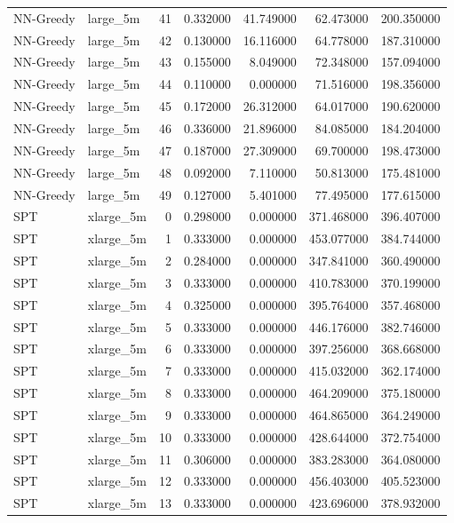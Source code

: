 \begin{tabular}{llrrrrr}
NN-Greedy & large_5m & 41 & 0.332000 & 41.749000 & 62.473000 & 200.350000 \\
NN-Greedy & large_5m & 42 & 0.130000 & 16.116000 & 64.778000 & 187.310000 \\
NN-Greedy & large_5m & 43 & 0.155000 & 8.049000 & 72.348000 & 157.094000 \\
NN-Greedy & large_5m & 44 & 0.110000 & 0.000000 & 71.516000 & 198.356000 \\
NN-Greedy & large_5m & 45 & 0.172000 & 26.312000 & 64.017000 & 190.620000 \\
NN-Greedy & large_5m & 46 & 0.336000 & 21.896000 & 84.085000 & 184.204000 \\
NN-Greedy & large_5m & 47 & 0.187000 & 27.309000 & 69.700000 & 198.473000 \\
NN-Greedy & large_5m & 48 & 0.092000 & 7.110000 & 50.813000 & 175.481000 \\
NN-Greedy & large_5m & 49 & 0.127000 & 5.401000 & 77.495000 & 177.615000 \\
SPT & xlarge_5m & 0 & 0.298000 & 0.000000 & 371.468000 & 396.407000 \\
SPT & xlarge_5m & 1 & 0.333000 & 0.000000 & 453.077000 & 384.744000 \\
SPT & xlarge_5m & 2 & 0.284000 & 0.000000 & 347.841000 & 360.490000 \\
SPT & xlarge_5m & 3 & 0.333000 & 0.000000 & 410.783000 & 370.199000 \\
SPT & xlarge_5m & 4 & 0.325000 & 0.000000 & 395.764000 & 357.468000 \\
SPT & xlarge_5m & 5 & 0.333000 & 0.000000 & 446.176000 & 382.746000 \\
SPT & xlarge_5m & 6 & 0.333000 & 0.000000 & 397.256000 & 368.668000 \\
SPT & xlarge_5m & 7 & 0.333000 & 0.000000 & 415.032000 & 362.174000 \\
SPT & xlarge_5m & 8 & 0.333000 & 0.000000 & 464.209000 & 375.180000 \\
SPT & xlarge_5m & 9 & 0.333000 & 0.000000 & 464.865000 & 364.249000 \\
SPT & xlarge_5m & 10 & 0.333000 & 0.000000 & 428.644000 & 372.754000 \\
SPT & xlarge_5m & 11 & 0.306000 & 0.000000 & 383.283000 & 364.080000 \\
SPT & xlarge_5m & 12 & 0.333000 & 0.000000 & 456.403000 & 405.523000 \\
SPT & xlarge_5m & 13 & 0.333000 & 0.000000 & 423.696000 & 378.932000 \\

\end{tabular}
